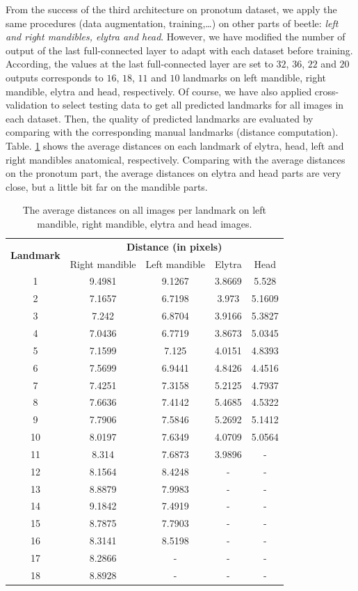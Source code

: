 \documentclass[review]{elsarticle}
\begin{document}
From the success of the third architecture on pronotum dataset, we apply the same procedures (data augmentation, training,\ldots) on other parts of beetle: \textit{left and right mandibles, elytra and head}. However, we have modified the number of output of the last full-connected layer to adapt with each dataset before training. According, the values at the last full-connected layer are set to $32$, $36$, $22$ and $20$ outputs corresponds to $16$, $18$, $11$ and $10$ landmarks on left mandible, right mandible, elytra and head, respectively. Of course, we have also applied cross-validation to select testing data to get all predicted landmarks for all images in each dataset. Then, the quality of predicted landmarks are evaluated by comparing with the corresponding manual landmarks (distance computation). Table. \ref{tblavg4parts} shows the average distances on each landmark of elytra, head, left and right mandibles anatomical, respectively. Comparing with the average distances on the pronotum part, the average distances on elytra and head parts are very close, but a little bit far on the mandible parts.

\begin{table}[htbp]
	\centering	
	\begin{tabular}{|c|c|c|c|c|}
		\hline
		\multirow{2}{*}{\textbf{Landmark}} & \multicolumn{4}{|c|}{\textbf{Distance (in pixels)}} \\ \cline{2-5}
		 & Right mandible & Left mandible & Elytra & Head  \\ \hline
		1 & 9.4981 & 9.1267 & 3.8669 & 5.528  \\ \hline
2 & 7.1657 & 6.7198 & 3.973 & 5.1609  \\ \hline
3 & 7.242 & 6.8704 & 3.9166 & 5.3827 \\ \hline
4 & 7.0436 & 6.7719 & 3.8673 & 5.0345 \\ \hline
5 & 7.1599 & 7.125 & 4.0151 & 4.8393 \\ \hline
6 & 7.5699 & 6.9441 & 4.8426 & 4.4516 \\ \hline
7 & 7.4251 & 7.3158 & 5.2125 & 4.7937 \\ \hline
8 & 7.6636 & 7.4142 & 5.4685 & 4.5322 \\ \hline
9 & 7.7906 & 7.5846 & 5.2692 & 5.1412 \\ \hline
10 & 8.0197 & 7.6349 & 4.0709 & 5.0564 \\ \hline
11 & 8.314 & 7.6873 & 3.9896 & - \\ \hline
12 & 8.1564 & 8.4248 & - & - \\ \hline
13 & 8.8879 & 7.9983 & - & - \\ \hline
14 & 9.1842 & 7.4919 & - & - \\ \hline
15 & 8.7875 & 7.7903 & - & - \\ \hline
16 & 8.3141 & 8.5198 & - & - \\ \hline
17 & 8.2866 & - & - & - \\ \hline
18 & 8.8928 & - & - & - \\ \hline
	\end{tabular}
	\caption{The average distances on all images per landmark on left mandible, right mandible, elytra and head images.}
	\label{tblavg4parts}
\end{table}
\end{document}
